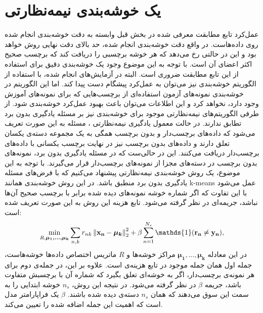 \section{یک خوشه‌بندی نیمه‌نظارتی}\label{clustering_method}
عمل‌کرد تابع مطابقت معرفی شده در بخش قبل وابسته به دقت خوشه‌بندی انجام شده روی داده‌هاست. در واقع دقت خوشه‌بندی انجام شده، حد بالای دقت نهایی روش خواهد بود و این در حالتی رخ می‌دهد که هر خوشه برچسبی را دریافت کند که برچسب صحیح  اکثر اعضای آن است. با توجه به این موضوع وجود یک خوشه‌بندی دقیق برای استفاده از این تابع مطابقت ضروری است. البته در آزمایش‌های انجام شده، با استفاده از  الگوریتم خوشه‌بندی
 \cite{kmeans}
نیز می‌توان به عمل‌کرد پیشگام دست پیدا کند. اما این الگوریتم در خوشه‌بندی نمونه‌های آزمون استفاده‌ای از برچسب‌هایی که برای نمونه‌های آموزش وجود دارد، نخواهد کرد و این اطلاعات می‌توان باعث بهبود عمل‌کرد خوشه‌بندی شود. از طرفی الگوریتم‌های نیمه‌نظارتی موجود برای خوشه‌بندی نیز بر مسئله یادگیری بدون برد تطابق ندارند. در حالت معمول یادگیری نیمه‌نظارتی \cite{chapel06}، مسئله به این صورت تعریف می‌شود که داده‌های برچسب‌دار و بدون برچسب همگی به یک مجموعه دسته‌ی یکسان تعلق دارند و داده‌های بدون برچسب نیز در نهایت برچسب یکسانی با داده‌های برچسب‌دار دریافت می‌کنند. این در حالی‌ست که در مسئله یادگیری بدون برد، نمونه‌های بدون برچسب در دسته‌های مجزا از نمونه‌های برچسب‌دار قرار می‌گیرند. با توجه به این موضوع، یک روش خوشه‌بندی نیمه‌نظارتی پیشنهاد می‌کنیم که با فرض‌های مسئله یادگیری بدون برد منطبق باشد. در این روش خوشه‌بندی همانند k-means عمل می‌شود با این تفاوت که اگر شماره خوشه نمونه‌های دیده شده  برابر با برچسب صحیح آن‌ها نباشد، جریمه‌ای در نظر گرفته می‌شود. تابع هزینه این روش به این صورت تعریف شده است:
\begin{equation} \label{eq:my_clustering}
\min_{R, \boldsymbol{\mu_1, \ldots, \mu_k }}  \sum_{n,k} r_{nk} \normtwo{\mathbf{x_n} - \boldsymbol{\mu_k}} +
 \beta \sum_{n=1}^{N_s} \mathds{1}(\mathbf{r_n} \neq \mathbf{y_n}),
\end{equation}
در این معادله $ \boldsymbol{\mu_1, \ldots, \mu_k }$ مراکز خوشه‌ها و $R$ ماتریس اختصاص داده‌ها خوشه‌هاست، جمله اول همان جمله موجود در تابع هزینه‌ی
است. علاوه بر این، در جمله‌ی دوم برای هر نمونه‌ی برچسب‌دار، اگر به خوشه‌ای تعلق بگیرد که شماره آن با برچسبش متفاوت باشد، جریمه $\beta$ در نظر گرفته می‌شود. در نتیجه این روش، $n_s$ خوشه ابتدایی را به سمت این سوق می‌دهند که همان $n_s$ دسته‌ی دیده شده باشند.  $\beta$ یک فراپارامتر مدل است که اهمیت این جمله اضافه شده را تعیین می‌کند.


